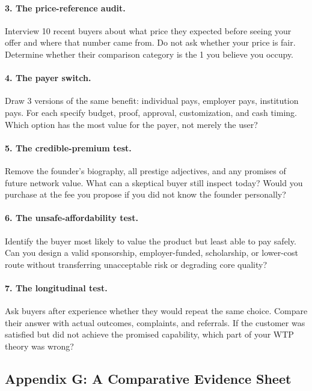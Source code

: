 \paragraph*{3. The price-reference audit.} Interview 10 recent buyers about what price they expected before seeing your offer and where that number came from. Do not ask whether your price is fair. Determine whether their comparison category is the 1 you believe you occupy.

\paragraph*{4. The payer switch.} Draw 3 versions of the same benefit: individual pays, employer pays, institution pays. For each specify budget, proof, approval, customization, and cash timing. Which option has the most value for the payer, not merely the user?

\paragraph*{5. The credible-premium test.} Remove the founder's biography, all prestige adjectives, and any promises of future network value. What can a skeptical buyer still inspect today? Would you purchase at the fee you propose if you did not know the founder personally?

\paragraph*{6. The unsafe-affordability test.} Identify the buyer most likely to value the product but least able to pay safely. Can you design a valid sponsorship, employer-funded, scholarship, or lower-cost route without transferring unacceptable risk or degrading core quality?

\paragraph*{7. The longitudinal test.} Ask buyers after experience whether they would repeat the same choice. Compare their answer with actual outcomes, complaints, and referrals. If the customer was satisfied but did not achieve the promised capability, which part of your WTP theory was wrong?

\subsection*{Appendix G: A Comparative Evidence Sheet}

